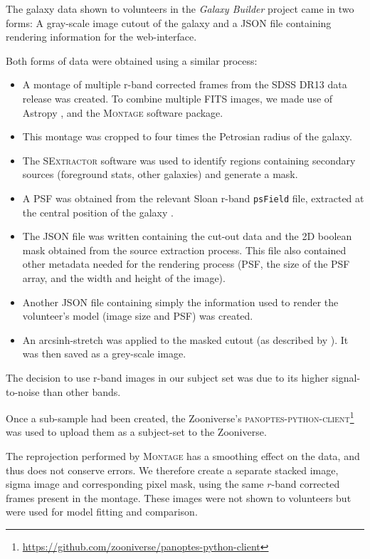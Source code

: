 \documentclass[../main.tex]{subfiles}
\begin{document}
The galaxy data shown to volunteers in the \textit{Galaxy Builder} project came in two forms: A gray-scale image cutout of the galaxy and a JSON file containing rendering information for the web-interface.

Both forms of data were obtained using a similar process:

\begin{itemize}
\item A montage of multiple r-band corrected frames from the SDSS DR13 \citep{2017ApJS..233...25A} data release was created. To combine multiple FITS images, we made use of Astropy \citep{2018AJ....156..123A}, and the \textsc{Montage} \citep{2010arXiv1005.4454J} software package.
\item This montage was cropped to four times the Petrosian radius of the galaxy.
\item The \textsc{SExtractor} software \citep{source-extractor} was used to identify regions containing secondary sources (foreground stats, other galaxies) and generate a mask.
\item A PSF was obtained from the relevant Sloan r-band \texttt{psField} file, extracted at the central position of the galaxy \citep{2002AJ....123..485S}.
\item The JSON file was written containing the cut-out data and the 2D boolean mask obtained from the source extraction process. This file also contained other metadata needed for the rendering process (PSF, the size of the PSF array, and the width and height of the image).
\item Another JSON file containing simply the information used to render the volunteer's model (image size and PSF) was created.
\item An arcsinh-stretch was applied to the masked cutout (as described by \citealt{Lupton2003:astro-ph/0312483v1}). It was then saved as a grey-scale image.
\end{itemize}

The decision to use r-band images in our subject set was due to its higher signal-to-noise than other bands.

Once a sub-sample had been created, the Zooniverse's \textsc{panoptes-python-client}\footnote{\url{https://github.com/zooniverse/panoptes-python-client}} was used to upload them as a subject-set to the Zooniverse.

The reprojection performed by \textsc{Montage} has a smoothing effect on the data, and thus does not conserve errors. We therefore create a separate stacked image, sigma image and corresponding pixel mask, using the same $r$-band corrected frames present in the montage. These images were not shown to volunteers but were used for model fitting and comparison.
\end{document}
